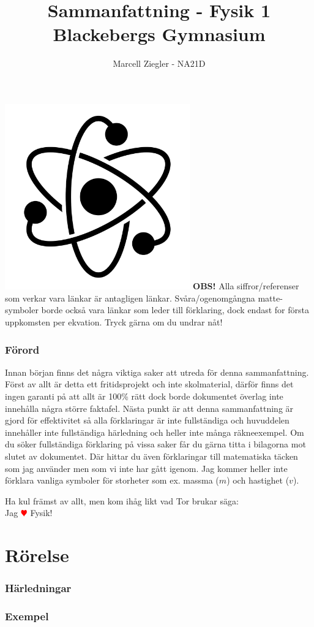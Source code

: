 \documentclass[12pt, a4paper]{article}
\title{Sammanfattning - Fysik 1 \\ Blackebergs Gymnasium}
\author{Marcell Ziegler - NA21D}
\theoremstyle{definition}
\begin{document}
    \begin{titlepage}
        \maketitle
        \centering
        \vfill
        \includegraphics[width=0.6\textwidth]{title.jpg}
        \vfill
        \textbf{OBS!} Alla siffror/referenser som verkar vara länkar är antagligen länkar. Svåra/ogenomgångna matte-symboler borde också vara länkar som leder till förklaring, dock endast for första uppkomsten per ekvation. Tryck gärna om du undrar nåt!
    \end{titlepage}

    \tableofcontents

    \newpage

    \section*{Förord}
    Innan början finns det några viktiga saker att utreda för denna sammanfattning. Först av allt är detta ett fritidsprojekt och inte skolmaterial, därför finns det ingen garanti på att allt är 100\% rätt dock borde dokumentet överlag inte innehålla några större faktafel. Nästa punkt är att denna sammanfattning är gjord för effektivitet så alla förklaringar är inte fullständiga och huvuddelen innehåller inte fullständiga härledning och heller inte många räkneexempel. Om du söker fullständiga förklaring på vissa saker får du gärna titta i bilagorna mot slutet av dokumentet. Där hittar du även förklaringar till matematiska täcken som jag använder men som vi inte har gått igenom. Jag kommer heller inte förklara vanliga symboler för storheter som ex. massma ($m$) och hastighet ($v$).
    \begin{center}
        \large{Ha kul främst av allt, men kom ihåg likt vad Tor brukar säga:}\\
        \Large{Jag \textcolor{red}{$\varheartsuit$} Fysik!}
    \end{center}

    \part{Rörelse}
    

    \newpage
    \appendix
    \section{Härledningar}
    \label{appendix:härledning}
    
    \section{Exempel}
    \label{appendix:exempel}
\end{document}
